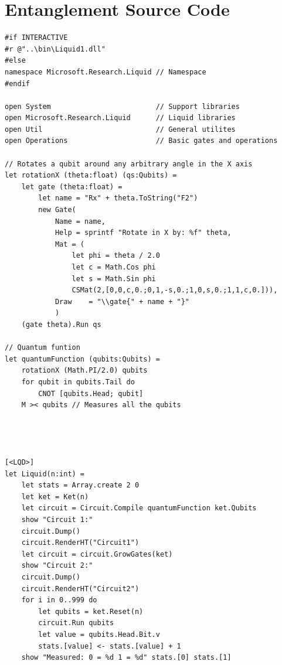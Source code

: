 \documentclass[12pt]{third-rep}
\begin{document}
\section{Entanglement Source Code}
\begin{verbatim}
#if INTERACTIVE
#r @"..\bin\Liquid1.dll"                 
#else
namespace Microsoft.Research.Liquid // Namespace
#endif

open System                         // Support libraries
open Microsoft.Research.Liquid      // Liquid libraries
open Util                           // General utilites
open Operations                     // Basic gates and operations

// Rotates a qubit around any arbitrary angle in the X axis 
let rotationX (theta:float) (qs:Qubits) =
    let gate (theta:float) =
        let name = "Rx" + theta.ToString("F2")
        new Gate(
            Name = name,
            Help = sprintf "Rotate in X by: %f" theta,
            Mat = (
                let phi = theta / 2.0
                let c = Math.Cos phi
                let s = Math.Sin phi
                CSMat(2,[0,0,c,0.;0,1,-s,0.;1,0,s,0.;1,1,c,0.])),
            Draw    = "\\gate{" + name + "}"
            )
    (gate theta).Run qs
    
// Quantum funtion
let quantumFunction (qubits:Qubits) =
    rotationX (Math.PI/2.0) qubits
    for qubit in qubits.Tail do 
        CNOT [qubits.Head; qubit]
    M >< qubits // Measures all the qubits




[<LQD>]
let Liquid(n:int) =
    let stats = Array.create 2 0
    let ket = Ket(n)
    let circuit = Circuit.Compile quantumFunction ket.Qubits
    show "Circuit 1:"
    circuit.Dump()
    circuit.RenderHT("Circuit1")
    let circuit = circuit.GrowGates(ket)
    show "Circuit 2:"
    circuit.Dump()
    circuit.RenderHT("Circuit2")
    for i in 0..999 do
        let qubits = ket.Reset(n) 
        circuit.Run qubits
        let value = qubits.Head.Bit.v
        stats.[value] <- stats.[value] + 1
    show "Measured: 0 = %d 1 = %d" stats.[0] stats.[1]
\end{verbatim}
\end{document}

